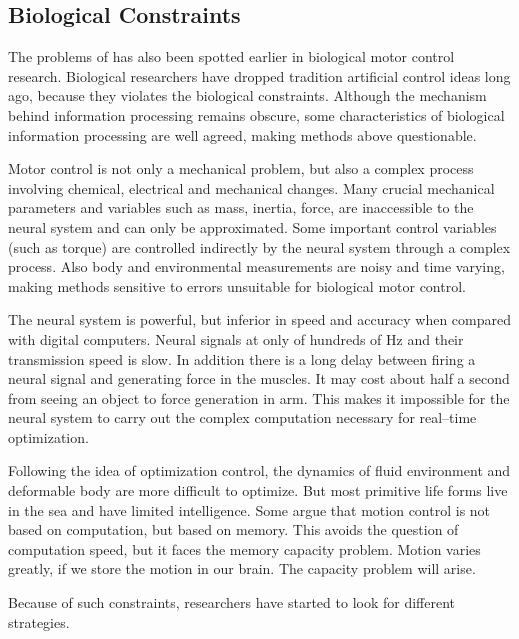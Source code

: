 \subsection{Biological Constraints}
The problems of \cms has also been spotted earlier in biological motor control research.
Biological researchers have dropped  tradition artificial control ideas long ago, because they  violates the biological constraints.
Although the mechanism behind information processing remains obscure, some characteristics of biological information processing are well agreed,  making  \cms methods above questionable\citep{Glynn2003}. 
  
\begin{itemize}
Motor control is not only a mechanical problem, but also a complex process involving chemical, electrical and mechanical changes.
Many crucial mechanical parameters and variables such as mass, inertia, force, are inaccessible to the neural system and can only be approximated. 
Some important control variables (such as torque) are controlled indirectly by the neural system through a complex process.
Also body and environmental measurements are noisy and time varying, making methods sensitive to errors unsuitable for biological motor control.

The neural system is powerful, but inferior in speed and accuracy when compared with digital computers. 
Neural signals at only of hundreds of Hz and their transmission speed is slow.
In addition there is a long delay between firing a neural signal and generating force in the muscles.
It may cost about half a second from seeing an object to force generation in arm. 
This makes it impossible for the neural system to carry out the complex computation necessary for real–time optimization.


Following the idea of optimization control, the dynamics of fluid environment and deformable body are more difficult to optimize. 
But most primitive life forms live in the sea and have limited intelligence. 
Some argue that motion control is not based on computation, but based on memory.
This avoids the question of computation speed, but it faces the memory capacity problem. 
Motion varies greatly, if we store the motion in our brain.
The capacity problem will arise.
\end{itemize}

Because of such constraints, researchers have started to look for different strategies.


